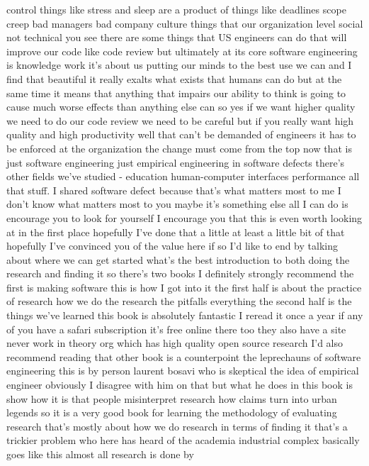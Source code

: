 \documentclass[conference, compsoc, twoside]{IEEEtran}
\begin{document}
control things like stress and sleep are
a product of things like
deadlines scope creep bad managers bad
company culture things that our
organization level social not technical
you see there are some things that US
engineers can do that will improve our
code like code review but ultimately at
its core software engineering is
knowledge work
it's about us putting our minds to the
best use we can and I find that beautiful it really exalts what exists
that humans can do but at the same time
it means that anything that impairs our
ability to think is going to cause much
worse effects than anything else can so
yes if we want higher quality we need to
do our code review we need to be careful
but if you really want high quality and
high productivity well that can't be
demanded of engineers it has to be
enforced at the organization the change
must come from the top now that is just
software engineering just empirical
engineering in software defects there's
other fields we've studied - education
human-computer interfaces performance
all that stuff.
I shared software defect because that's
what matters most to me I don't know
what matters most to you maybe it's
something else all I can do is encourage
you to look for yourself
I encourage you that this is even worth
looking at in the first place hopefully
I've done that a little at least a
little bit of that hopefully I've
convinced you of the value here if so
I'd like to end by talking about where
we can get started what's the best
introduction to both doing the research
and finding it so there's two books I
definitely strongly recommend the first
is making software this is how I got
into it the first half is about the
practice of research how we do the
research the pitfalls everything the
second half is the things we've learned
this book is absolutely fantastic I
reread it once a year if any of you have
a safari subscription it's free online
there too they also have a site never
work in theory org which has high
quality open source research I'd also
recommend reading that other book is a
counterpoint the leprechauns of software
engineering this is by person laurent
bosavi who is skeptical the idea of
empirical engineer
obviously I disagree with him on that
but what he does in this book is show
how it is that people misinterpret
research how claims turn into urban
legends so it is a very good book for
learning the methodology of evaluating
research that's mostly about how we do
research in terms of finding it
that's a trickier problem who here has
heard of the academia industrial complex
basically goes like this
almost all research is done by
\end{document}
